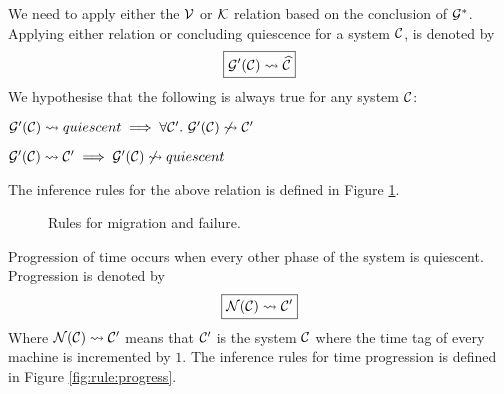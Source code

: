 \newpage
We need to apply either the $\mathcal{V}$ or $\mathcal{K}$ relation based on the conclusion of
$\mathcal{G}^*$. Applying either relation or concluding quiescence for a system $\mathcal{C}$, is
denoted by
\begin{equation*}
\boxed{\mathcal{G}'(\mathcal{C}) \leadsto \widehat{\mathcal{C}}}
\end{equation*}
We hypothesise that the following is always true for any system $\mathcal{C}$:
\begin{theorem}
$\mathcal{G}'(\mathcal{C}) \leadsto quiescent \implies \forall \mathcal{C}'.~ \mathcal{G}'(\mathcal{C}) \not\leadsto \mathcal{C}'$
\end{theorem}
\begin{theorem}
$\mathcal{G}'(\mathcal{C}) \leadsto \mathcal{C}' \implies \mathcal{G}'(\mathcal{C}) \not\leadsto quiescent$
\end{theorem}
The inference rules for the above relation is defined in Figure
\ref{fig:rule:mighalt}.

\begin{figure}[!ht]
\caption{Rules for migration and failure.}\label{fig:rule:mighalt}
\end{figure}

Progression of time occurs when every other phase of the system is quiescent.
Progression is denoted by
\begin{equation*}
\boxed{\mathcal{N}(\mathcal{C}) \leadsto \mathcal{C}'}
\end{equation*}
Where $\mathcal{N}(\mathcal{C}) \leadsto \mathcal{C}'$ means that $\mathcal{C}'$ is the system $\mathcal{C}$ where the time
tag of every machine is incremented by $1$. The inference rules for time
progression is defined in Figure \ref{fig:rule:progress}.


